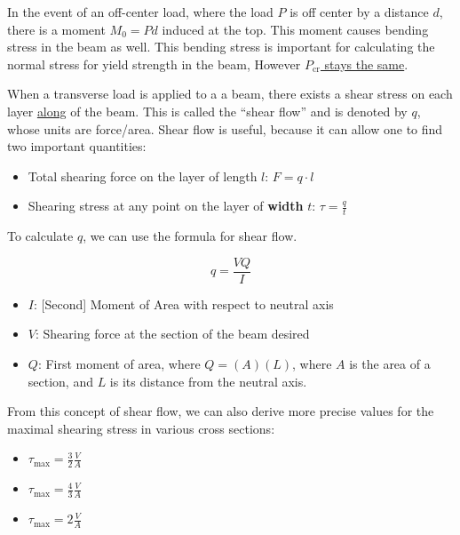 \documentclass{article}
\begin{document}
 In the event of an off-center load, where the load $P$
is off center by a distance $d$, there is a moment $M_0 = Pd$ induced at the top.
This moment causes bending stress in the beam as well. This bending stress is important
for calculating the normal stress for yield strength in the beam, However
\underline{$P_\textrm{cr}$ stays the same}.

\pagebreak
{}

When a transverse load is applied to a a beam, there exists a shear stress on each
layer \underline{along} of the beam. This is called the ``shear flow'' and is 
denoted by $q$, whose units are force/area. Shear flow is useful, because it can 
allow one to find two important quantities:
\begin{itemize}
    \item Total shearing force on the layer of length $l$: $F = q \cdot l$
    \item Shearing stress at any point on the layer of \textbf{width} $t$: $\tau = \frac{q}{t}$
\end{itemize}  
To calculate $q$, we can use the formula for shear flow.
\begin{multicols}{2}
    \[
        q = \frac{VQ}{I}
    \]
    \columnbreak
    \begin{itemize}
        \item $I$: [Second] Moment of Area with respect to neutral axis
        \item $V$: Shearing force at the section of the beam desired
        \item $Q$: First moment of area, where $Q = (A)(L)$, where $A$ is the 
        area of a section, and $L$ is its distance from the neutral axis.
    \end{itemize}
\end{multicols}

From this concept of shear flow, we can also derive more precise values for the 
maximal shearing stress in various cross sections:
\begin{itemize}
    \item {} $\tau_\textrm{max} = \frac{3}{2} \frac{V}{A}$
    \item {} $\tau_\textrm{max} = \frac{4}{3} \frac{V}{A}$
    \item {} $\tau_\textrm{max} = 2 \frac{V}{A}$
\end{itemize}
\end{document}
